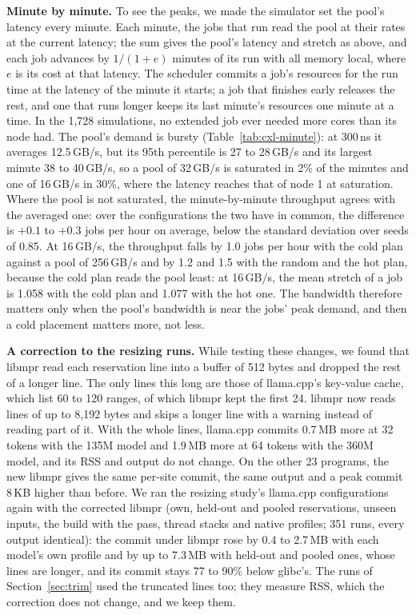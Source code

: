 \documentclass[11pt]{article}
\newcommand{\secref}[1]{Section~\ref{#1}}
\newcommand{\tabref}[1]{Table~\ref{#1}}
\begin{document}
\textbf{Minute by minute.} To see the peaks, we made the simulator set the pool's latency every minute. Each minute,
the jobs that run read the pool at their rates at the current latency; the sum gives the pool's latency and stretch
as above, and each job advances by $1 / (1 + e)$ minutes of its run with all memory local, where $e$ is its cost at
that latency. The scheduler commits a job's resources for the run time at the latency of the minute it starts; a job
that finishes early releases the rest, and one that runs longer keeps its last minute's resources one minute at a
time. In the 1{,}728 simulations, no extended job ever needed more cores than its node had. The pool's demand is
bursty (\tabref{tab:cxl-minute}): at 300\,ns it averages 12.5\,GB/s, but its 95th percentile is 27 to 28\,GB/s and
its largest minute 38 to 40\,GB/s, so a pool of 32\,GB/s is saturated in 2\% of the minutes and one of 16\,GB/s in
30\%, where the latency reaches that of node 1 at saturation. Where the pool is not saturated, the minute-by-minute
throughput agrees with the averaged one: over the configurations the two have in common, the difference is
$+0.1$ to $+0.3$ jobs per hour on average, below the standard deviation over seeds of 0.85. At 16\,GB/s, the
throughput falls by 1.0 jobs per hour with the cold plan against a pool of 256\,GB/s and by 1.2 and 1.5 with the
random and the hot plan, because the cold plan reads the pool least: at 16\,GB/s, the mean stretch of a job is 1.058
with the cold plan and 1.077 with the hot one. The bandwidth therefore matters only when the pool's bandwidth is near the jobs'
peak demand, and then a cold placement matters more, not less.

\textbf{A correction to the resizing runs.} While testing these changes, we found that libmpr read each reservation
line into a buffer of 512 bytes and dropped the rest of a longer line. The only lines this long are those of
llama.cpp's key-value cache, which list 60 to 120 ranges, of which libmpr kept the first 24. libmpr now reads lines of
up to 8{,}192 bytes and skips a longer line with a warning instead of reading part of it. With the whole lines, llama.cpp commits 0.7\,MB more at 32 tokens with the 135M model and 1.9\,MB
more at 64 tokens with the 360M model, and its RSS and output do not change. On the other 23 programs, the new
libmpr gives the same per-site commit, the same output and a peak commit 8\,KB higher than before. We ran the
resizing study's llama.cpp configurations again with the corrected libmpr (own, held-out and pooled reservations,
unseen inputs, the build with the pass, thread stacks and native profiles; 351 runs, every output identical): the
commit under libmpr rose by 0.4 to 2.7\,MB with each model's own profile and by up to 7.3\,MB with held-out and
pooled ones, whose lines are longer, and its commit stays 77 to 90\% below glibc's. The runs of
\secref{sec:trim} used the truncated lines too; they measure RSS, which the correction does not change, and we
keep them.
\end{document}
